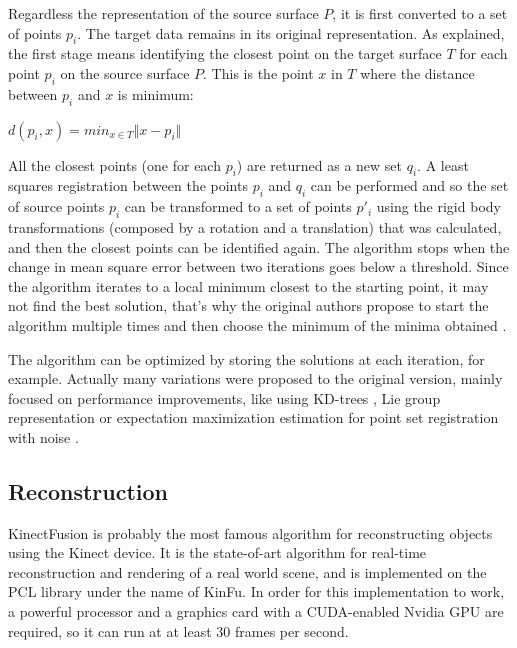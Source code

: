 \documentclass[msc, a4paper, classic, en]{ufbathesis}
\begin{document}
Regardless the representation of the source surface $P$, it is first converted to a set of points ${p_i}$. The target data remains in its original representation. As explained, the first stage means identifying the closest point on the target surface $T$ for each point $p_i$ on the source surface $P$. This is the point $x$ in $T$ where the distance between $p_i$ and $x$ is minimum:

\begin{center}
  $d(p_i, x) = min_{x \in T} \Vert x - p_i \Vert$
\end{center}

All the closest points (one for each $p_i$) are returned as a new set ${q_i}$. A least squares registration between the points $p_i$ and $q_i$ can be performed and so the set of source points $p_i$ can be transformed to a set of points $p'_i$ using the rigid body transformations (composed by a rotation and a translation) that was calculated, and then the closest points can be identified again. The algorithm stops when the change in mean square error between two iterations goes below a threshold. Since the algorithm iterates to a local minimum closest to the starting point, it may not find the best solution, that's why the original authors propose to start the algorithm multiple times and then choose the minimum of the minima obtained \cite{icp}.

The algorithm can be optimized by storing the solutions at each iteration, for example. Actually many variations were proposed to the original version, mainly focused on performance improvements, like using KD-trees \cite{zhang1994}, Lie group representation \cite{Dong201467} or expectation maximization estimation for point set registration with noise \cite{6957732}.

\subsection{Reconstruction}
\label{sec:kinfu}

KinectFusion \cite{kinfu} \cite{kinfu2} is probably the most famous algorithm for reconstructing objects using the Kinect device. It is the state-of-art algorithm for real-time reconstruction and rendering of a real world scene, and is implemented on the PCL \cite{pcl} library under the name of KinFu. In order for this implementation to work, a powerful processor and a graphics card with a CUDA-enabled Nvidia GPU are required, so it can run at at least 30 frames per second.
\end{document}
